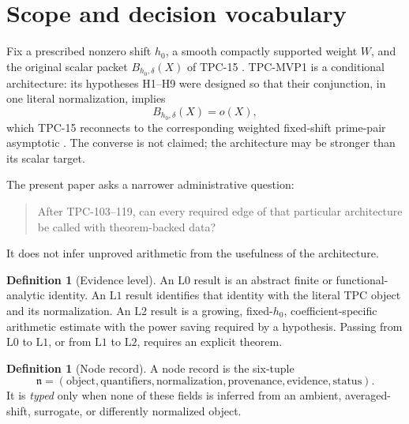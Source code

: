 \documentclass[11pt,a4paper]{article}
\theoremstyle{definition}
\newtheorem{definition}[theorem]{Definition}
\theoremstyle{remark}
\newcommand{\Lzero}{\mathrm{L0}}
\newcommand{\Lone}{\mathrm{L1}}
\newcommand{\Ltwo}{\mathrm{L2}}
\begin{document}
\section{Scope and decision vocabulary}

Fix a prescribed nonzero shift \(h_0\), a smooth compactly supported
weight \(W\), and the original scalar packet
\(B_{h_0,\delta}(X)\) of TPC-15 \citep{WangTPC15}.  TPC-MVP1 is a
conditional architecture: its hypotheses H1--H9 were designed so
that their conjunction, in one literal normalization, implies
\[
 B_{h_0,\delta}(X)=o(X),
\]
which TPC-15 reconnects to the corresponding weighted fixed-shift
prime-pair asymptotic \citep{WangMVP1}.  The converse is not claimed;
the architecture may be stronger than its scalar target.

The present paper asks a narrower administrative question:
\begin{quote}
After TPC-103--119, can every required edge of that particular
architecture be called with theorem-backed data?
\end{quote}
It does not infer unproved arithmetic from the usefulness of the
architecture.

\begin{definition}[Evidence level]
\label{def:levels}
An \(\Lzero\) result is an abstract finite or functional-analytic
identity.  An \(\Lone\) result identifies that identity with the
literal TPC object and its normalization.  An \(\Ltwo\) result is a
growing, fixed-\(h_0\), coefficient-specific arithmetic estimate
with the power saving required by a hypothesis.  Passing from
\(\Lzero\) to \(\Lone\), or from \(\Lone\) to \(\Ltwo\), requires an
explicit theorem.
\end{definition}

\begin{definition}[Node record]
\label{def:record}
A node record is the six-tuple
\[
 {\mathfrak n}
 =
 (\text{object},\text{quantifiers},\text{normalization},
  \text{provenance},\text{evidence},\text{status}).
\]
It is \emph{typed} only when none of these fields is inferred from an
ambient, averaged-shift, surrogate, or differently normalized
object.
\end{definition}
\end{document}
